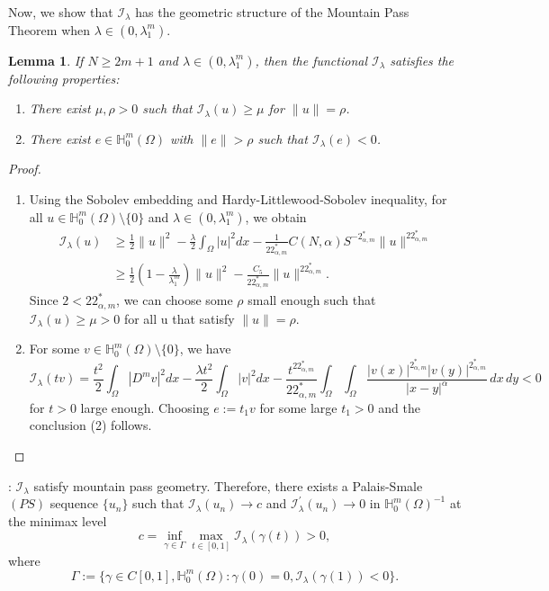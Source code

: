 \documentclass[reqno]{amsart}
\newtheorem{lemma}[theorem]{Lemma}
\newcommand{\la} {\lambda}
\newcommand{\Om}{\Omega}
\newcommand{\al} {\alpha}
\newcommand{\ga} {\gamma}
\newcommand{\Ga} {\Gamma}
\newcommand{\noi} {  \noindent}
\newcommand{\mb} {\mathbb}
\newcommand{\mc} {\mathcal}
\numberwithin{theorem}{section} \numberwithin{equation}{section}
\begin{document}
\noi Now, we show that $\mc{I}_\la$ has the geometric structure of the Mountain Pass Theorem when $\la \in (0, \la^m_1 )$.
\begin{lemma} \label{l19}
If $N\geq 2m+1$ and ${\la}\in (0, \la^m_1)$, then the functional   $\mc{I}_{\la}$ satisfies the following properties:
\begin{enumerate}
\item There exist $\mu, \rho>0$ such that $\mc{I}_\la(u)\geq \mu$ for $\|u\|=\rho$.
\item There exist $e\in \mb{H}^m_0(\Om)$ with $\|e\|>{\rho}$ such that $\mc{I}_\la(e)<0$.   
\end{enumerate}\end{lemma}

\begin{proof}\begin{enumerate}
\item Using the Sobolev embedding and Hardy-Littlewood-Sobolev inequality, for all $u\in\mb{H}_0^{m}(\Om)\setminus\{0\}$ and ${\la}\in (0,\la^m_1)$, we obtain
\begin{align*}
\mc I_\la(u) &\geq \frac{1}{2}\| u \|^2  -\frac{\la} {2}\int_{\Om}|u|^{2} dx-\frac{1}{22^*_{\al, m}}C(N, \al)S^{-2^*_{\al, m}}\| u \|^{22^*_{\al, m}}\\
&\geq\frac{1}{2}\left(1-\frac{\la}{\la^m_1}\right)\| u \|^2 -\frac{C_5}{22^*_{\al, m}}\| u \|^{22^*_{\al, m}}.
\end{align*}
Since $2<{22^*_{\al, m}}$, we can choose some $\rho$ small enough such that $\mc I_\la(u)\geq\mu>0$ for all u that satisfy $\|u\|=\rho$.
\item For some  $v\in\mb{H}_0^{m}(\Om)\setminus\{0\}$, we have
\[\mc I_\la(tv)= \frac{t^2}{2}\int_{\Om}|D^{m}v|^2 dx -\frac{\la t^{2}}{2}\int_{\Om}|v|^{2} dx-\frac{t^{22^*_{\al, m}}}{22^*_{\al, m}}\int_{\Om}\int_{\Om} \frac{|v(x)|^{2_{\al, m}^{*}}|v(y)|^{2_{\al, m}^{*}}}{|x-y|^{\al}} \, dx \, dy <0\]
for $t>0$ large enough. Choosing $e:=t_1v$ for some large $t_1>0$ and the conclusion (2) follows. 
\end{enumerate}
\end{proof}
\noi{\bf{Remark}}: $\mc I_\la$ satisfy mountain pass geometry. Therefore, there exists a  Palais-Smale $(PS)$ sequence $\{u_n\}$ such that $\mc{I}_\la(u_n)\rightarrow c$ and $\mc{I^{\prime}_\la}(u_n)\rightarrow 0$ in $\mb{H}_0^{m}(\Om)^{-1}$ at the  minimax level 
\[c=\inf_{\ga\in\Ga}\max_{t\in[0, 1]} \mc{I}_\la(\ga(t))>0,\]
where
\[\Ga:=\{\ga\in C[0, 1], \mb{H}_0^{m}(\Om):\ga(0)=0, \mc{I}_\la(\ga(1))<0\}.\]
\end{document}
